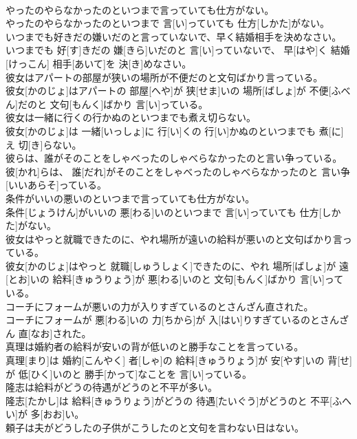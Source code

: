 \documentclass[8pt]{extreport}
\begin{document}
\begin{CJK}{UTF8}{min}
\\	やったのやらなかったのといつまで言っていても仕方がない。	
\\	やったのやらなかったのといつまで 言[い]っていても 仕方[しかた]がない。
\\	いつまでも好きだの嫌いだのと言っていないで、早く結婚相手を決めなさい。	
\\	いつまでも 好[す]きだの 嫌[きら]いだのと 言[い]っていないで、 早[はや]く 結婚[けっこん] 相手[あいて]を 決[き]めなさい。
\\	彼女はアパートの部屋が狭いの場所が不便だのと文句ばかり言っている。	
\\	彼女[かのじょ]はアパートの 部屋[へや]が 狭[せま]いの 場所[ばしょ]が 不便[ふべん]だのと 文句[もんく]ばかり 言[い]っている。
\\	彼女は一緒に行くの行かぬのといつまでも煮え切らない。	
\\	彼女[かのじょ]は 一緒[いっしょ]に 行[い]くの 行[い]かぬのといつまでも 煮[に]え 切[き]らない。
\\	彼らは、誰がそのことをしゃべったのしゃべらなかったのと言い争っている。	
\\	彼[かれ]らは、 誰[だれ]がそのことをしゃべったのしゃべらなかったのと 言い争[いいあらそ]っている。
\\	条件がいいの悪いのといつまで言っていても仕方がない。	
\\	条件[じょうけん]がいいの 悪[わる]いのといつまで 言[い]っていても 仕方[しかた]がない。
\\	彼女はやっと就職できたのに、やれ場所が遠いの給料が悪いのと文句ばかり言っている。	
\\	彼女[かのじょ]はやっと 就職[しゅうしょく]できたのに、やれ 場所[ばしょ]が 遠[とお]いの 給料[きゅうりょう]が 悪[わる]いのと 文句[もんく]ばかり 言[い]っている。
\\	コーチにフォームが悪いの力が入りすぎているのとさんざん直された。	
\\	コーチにフォームが 悪[わる]いの 力[ちから]が 入[はい]りすぎているのとさんざん 直[なお]された。
\\	真理は婚約者の給料が安いの背が低いのと勝手なことを言っている。	
\\	真理[まり]は 婚約[こんやく] 者[しゃ]の 給料[きゅうりょう]が 安[やす]いの 背[せ]が 低[ひく]いのと 勝手[かって]なことを 言[い]っている。
\\	隆志は給料がどうの待遇がどうのと不平が多い。	
\\	隆志[たかし]は 給料[きゅうりょう]がどうの 待遇[たいぐう]がどうのと 不平[ふへい]が 多[おお]い。
\\	頼子は夫がどうしたの子供がこうしたのと文句を言わない日はない。	

\end{CJK}
\end{document}

